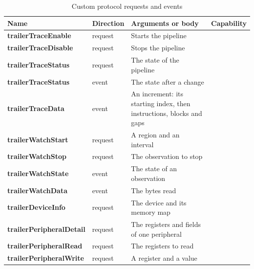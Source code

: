 \begin{table}[H]
    \centering
    \caption{Custom protocol requests and events}
    \label{tab:extensions}
    \begin{tabularx}{\linewidth}{| @{}>{\hsize\bfseries\ttfamily\scriptsize}Y | >{\hsize}Y | >{\hsize}Y | >{\hsize\ttfamily\scriptsize}Y@{} |}
        \hline
        \rmfamily\normalsize Name & \textbf{Direction} & \textbf{Arguments or body} & \rmfamily\normalsize\bfseries Capability \\
        \hline
        trailerTraceEnable & \rmfamily request & \rmfamily Starts the pipeline &  \\
        trailerTraceDisable & \rmfamily request & \rmfamily Stops the pipeline & \\
        trailerTraceStatus & \rmfamily request & \rmfamily The state of the pipeline & \\
        trailerTraceStatus & \rmfamily event & \rmfamily The state after a change & \\
        trailerTraceData & \rmfamily event & \rmfamily An increment: its starting index, then instructions, blocks and gaps & \\
        \hline
        trailerWatchStart & \rmfamily request & \rmfamily A region and an interval &  \\
        trailerWatchStop & \rmfamily request & \rmfamily The observation to stop & \\
        trailerWatchState & \rmfamily event & \rmfamily The state of an observation & \\
        trailerWatchData & \rmfamily event & \rmfamily The bytes read & \\
        \hline
        trailerDeviceInfo & \rmfamily request & \rmfamily The device and its memory map &  \\
        trailerPeripheralDetail & \rmfamily request & \rmfamily The registers and fields of one peripheral & \\
        trailerPeripheralRead & \rmfamily request & \rmfamily The registers to read & \\
        trailerPeripheralWrite & \rmfamily request & \rmfamily A register and a value & \\

\end{tabularx}
\end{table}
